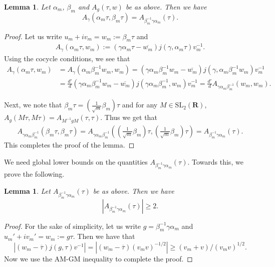 \documentclass[11pt]{amsart}
\numberwithin{equation}{section}
\theoremstyle{plain}
\newtheorem{lem}[thm]{Lemma}
\theoremstyle{definition}
\newcommand{\mf}{\mathbf}
\newcommand{\mrm}{\mathrm}
\newcommand{\sltwor}{\mrm{SL}_2(\mf R)}
\begin{document}
\begin{lem}\label{lem:Agamma}
    Let $\alpha_m$, $\beta_m$ and $A_g(\tau,w)$ be as above. Then we have
    \begin{equation}
        A_{\gamma}(\alpha_m\tau, \beta_m\tau)= A_{\beta_m^{-1} \gamma \alpha_m}(\tau).
    \end{equation}
\end{lem}
\begin{proof}
Let us write  $u_m+iv_m=w_m:= \beta_m\tau $ and 
\begin{align}
A_\gamma(\alpha_m\tau,w_m):=(\gamma\alpha_m\tau-\overline{w_m})j(\gamma,\alpha_m\tau)v_m^{-1}.
\end{align}
Using the cocycle conditions, we see that
\begin{align}
A_\gamma(\alpha_m\tau,w_m)&=A_\gamma(\alpha_m\beta_m^{-1} w_m, w_m)= (\gamma\alpha_m\beta_m^{-1}w_m-\overline{w_m})j(\gamma,\alpha_m\beta_m^{-1}w_m)v_m^{-1}\\
    &=\frac{d'}{d} (\gamma\alpha_m\beta_m^{-1}w_m-\overline{w_m})j(\gamma\alpha_m\beta_m^{-1},w_m)v_m^{-1}= \frac{d'}{d} A_{\gamma\alpha_m\beta_m^{-1}}( w_m, w_m).\label{d'd}
\end{align}

Next, we note that $\beta_m\tau= (\frac{1}{\sqrt m}\beta_m )\tau$ and for any $M\in\sltwor$, $A_g(M\tau, M\tau)= A_{M^{-1}gM}(\tau,\tau)$. Thus we get that
\begin{align}
    A_{\gamma\alpha_m\beta_m^{-1}}( \beta_m \tau, \beta_m \tau)= A_{\gamma\alpha_m\beta_m^{-1}}( (\frac{1}{\sqrt m}\beta_m) \tau, (\frac{1}{\sqrt m}\beta_m) \tau)= A_{\beta_m^{-1} \gamma \alpha_m}(\tau).
\end{align}
This completes the proof of the lemma.
\end{proof}
We need global lower bounds on the quantities $A_{\beta_m^{-1}\gamma\alpha_m}( \tau)$. Towards this, we prove the following.

\begin{lem}\label{lem:lowAg}
    Let $A_{\beta_m^{-1}\gamma\alpha_m}( \tau)$ be as above. Then we have 
    \begin{equation}
        |A_{\beta_m^{-1}\gamma\alpha_m}( \tau)|\ge 2.
    \end{equation}
\end{lem}
\begin{proof}
For the sake of simplicity, let us write $g= \beta_m^{-1}\gamma\alpha_m$ and $u_m'+iv_m'=w_m:= g\tau$.
Then we have that
\begin{equation}
\left| (w_m-\overline{\tau})j(g,\tau) v^{-1} \right|= |(w_m-\overline{\tau})(v_m v)^{-1/2}|\ge (v_m+v)/(v_m v)^{1/2}.
\end{equation}
 Now we use the AM-GM inequality to complete the proof. \qedhere
\end{proof}
\end{document}
